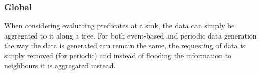 \subsubsection{Global}

When considering evaluating predicates at a sink, the data can simply be aggregated to it along a tree. For both event-based and periodic data generation the way the data is generated can remain the same, the requesting of data is simply removed (for periodic) and instead of flooding the information to neighbours it is aggregated instead.

